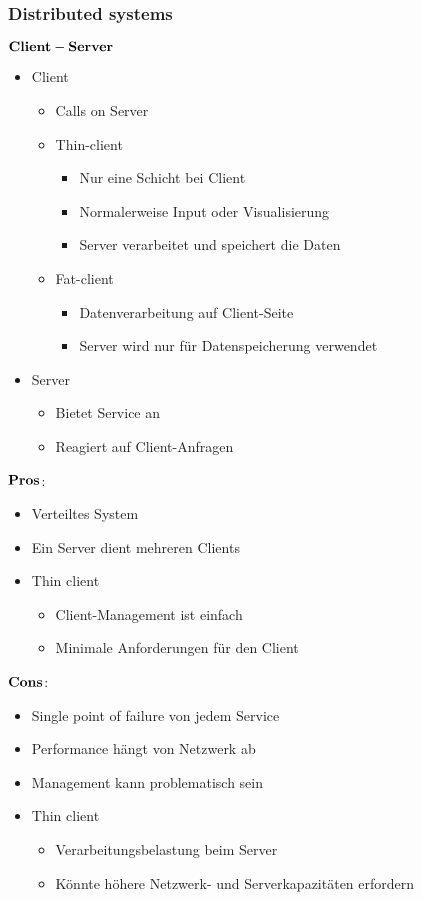 \subsubsection{Distributed systems}
$\bold{Client-Server}$
\begin{itemize}
	\item Client
		\begin{itemize}
			\item Calls on Server
			\item Thin-client
				\begin{itemize}
					\item Nur eine Schicht bei Client
					\item Normalerweise Input oder Visualisierung
					\item Server verarbeitet und speichert die Daten
				\end{itemize}
			\item Fat-client
				\begin{itemize}
					\item Datenverarbeitung auf Client-Seite
					\item Server wird nur für Datenspeicherung verwendet
				\end{itemize}
		\end{itemize}
	\item Server
		\begin{itemize}
			\item Bietet Service an
			\item Reagiert auf Client-Anfragen
		\end{itemize}
\end{itemize}
\begin{multicols}{2}
$\bold{Pros}$:
\begin{itemize}
	\item Verteiltes System
	\item Ein Server dient mehreren Clients
	\item Thin client
		\begin{itemize}
			\item Client-Management ist einfach
			\item Minimale Anforderungen für den Client
		\end{itemize}
\end{itemize}
\columnbreak
$\bold{Cons}$:
\begin{itemize}
	\item Single point of failure von jedem Service
	\item Performance hängt von Netzwerk ab
	\item Management kann problematisch sein
	\item Thin client
		\begin{itemize}
			\item Verarbeitungsbelastung beim Server
			\item Könnte höhere Netzwerk- und Serverkapazitäten erfordern
		\end{itemize}
\end{itemize}
\end{multicols}
